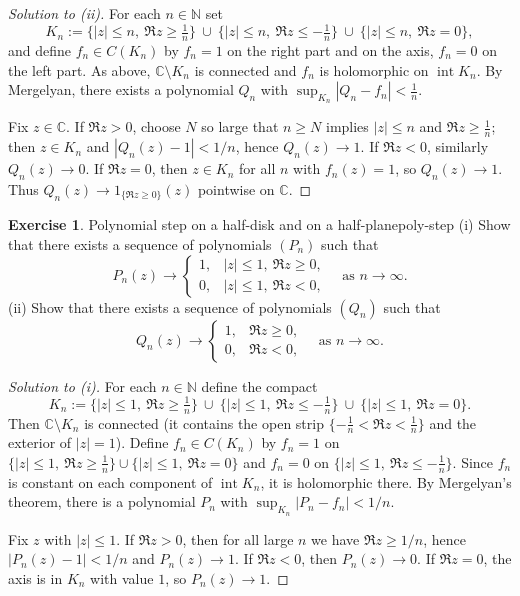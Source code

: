 \documentclass[11pt,a4paper]{article}
\theoremstyle{definition}
\newtheorem{exercise}{Exercise} %
\theoremstyle{definition}
\theoremstyle{plain}
\theoremstyle{remark}
\begin{document}
\begin{proof}[Solution to (ii)]
	For each $n\in\mathbb N$ set
	\[
	K_n:=\bigl\{|z|\le n,\ \Re z\ge \tfrac1n\bigr\}\ \cup\
	\bigl\{|z|\le n,\ \Re z\le -\tfrac1n\bigr\}\ \cup\
	\bigl\{|z|\le n,\ \Re z=0\bigr\},
	\]
	and define $f_n\in C(K_n)$ by $f_n=1$ on the right part and on the axis, $f_n=0$ on the left part.
	As above, $\mathbb C\setminus K_n$ is connected and $f_n$ is holomorphic on $\operatorname{int}K_n$.
	By Mergelyan, there exists a polynomial $Q_n$ with $\sup_{K_n}|Q_n-f_n|<\tfrac1n$.
	
	Fix $z\in\mathbb C$.
	If $\Re z>0$, choose $N$ so large that $n\ge N$ implies $|z|\le n$ and $\Re z\ge\tfrac1n$;
	then $z\in K_n$ and $|Q_n(z)-1|<1/n$, hence $Q_n(z)\to1$.
	If $\Re z<0$, similarly $Q_n(z)\to0$. If $\Re z=0$, then $z\in K_n$ for all $n$ with $f_n(z)=1$,
	so $Q_n(z)\to1$.
	Thus $Q_n(z)\to 1_{\{\Re z\ge0\}}(z)$ pointwise on $\mathbb C$.
\end{proof}

\begin{exercise}{Polynomial step on a half-disk and on a half-plane}{poly-step}
	(i) Show that there exists a sequence of polynomials $(P_n)$ such that
	\[
	P_n(z)\longrightarrow
	\begin{cases}
		1,& |z|\le 1,\ \Re z\ge 0,\\[2pt]
		0,& |z|\le 1,\ \Re z<0,
	\end{cases}
	\quad\text{as }n\to\infty.
	\]
	(ii) Show that there exists a sequence of polynomials $(Q_n)$ such that
	\[
	Q_n(z)\longrightarrow
	\begin{cases}
		1,& \Re z\ge 0,\\[2pt]
		0,& \Re z<0,
	\end{cases}
	\quad\text{as }n\to\infty.
	\]
\end{exercise}

\begin{proof}[Solution to (i)]
	For each $n\in\mathbb N$ define the compact
	\[
	K_n:=\bigl\{|z|\le1,\ \Re z\ge \tfrac1n\bigr\}
	\ \cup\ \bigl\{|z|\le1,\ \Re z\le -\tfrac1n\bigr\}
	\ \cup\ \bigl\{|z|\le1,\ \Re z=0\bigr\}.
	\]
	Then $\mathbb C\setminus K_n$ is connected (it contains the open strip
	$\{-\tfrac1n<\Re z<\tfrac1n\}$ and the exterior of $|z|=1$). Define
	$f_n\in C(K_n)$ by $f_n=1$ on $\{|z|\le1,\ \Re z\ge\tfrac1n\}\cup\{|z|\le1,\ \Re z=0\}$ and
	$f_n=0$ on $\{|z|\le1,\ \Re z\le-\tfrac1n\}$. Since $f_n$ is constant on each component
	of $\operatorname{int}K_n$, it is holomorphic there. By Mergelyan’s theorem,
	there is a polynomial $P_n$ with $\sup_{K_n}|P_n-f_n|<1/n$.
	
	Fix $z$ with $|z|\le1$. If $\Re z>0$, then for all large $n$ we have
	$\Re z\ge 1/n$, hence $|P_n(z)-1|<1/n$ and $P_n(z)\to1$. If $\Re z<0$, then
	$P_n(z)\to0$. If $\Re z=0$, the axis is in $K_n$ with value $1$, so $P_n(z)\to1$.
\end{proof}
\end{document}
